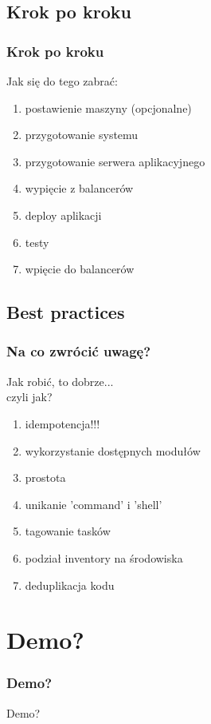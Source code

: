 \documentclass[10pt]{beamer}
\begin{document}
\subsection{Krok po kroku}
\begin{frame}
\frametitle{Krok po kroku}
Jak się do tego zabrać:
\begin{enumerate}
\item{postawienie maszyny (opcjonalne)}
\item{przygotowanie systemu}
\item{przygotowanie serwera aplikacyjnego}
\item{wypięcie z balancerów}
\item{deploy aplikacji}
\item{testy}
\item{wpięcie do balancerów}
\end{enumerate}
\end{frame}
\subsection{Best practices}
\begin{frame}
\frametitle{Na co zwrócić uwagę?}
Jak robić, to dobrze...\\
czyli jak?
\begin{enumerate}
\item{idempotencja!!!}
\item{wykorzystanie dostępnych modułów}
\item{prostota}
\item{unikanie 'command' i 'shell'}
\item{tagowanie tasków}
\item{podział inventory na środowiska}
\item{deduplikacja kodu}
\end{enumerate}
\end{frame}
\section{Demo?}
\begin{frame}
\frametitle{Demo?}
Demo?
\end{frame}
\end{document}
